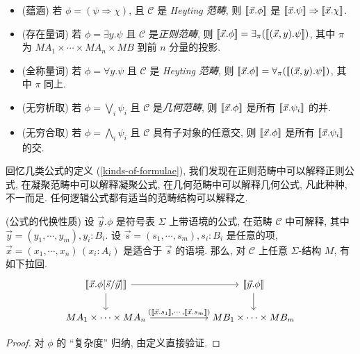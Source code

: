 \begin{definition}
\begin{itemize}
		\item (蕴涵) 若 $\phi = (\psi \Rightarrow \chi)$, 且 $\mathcal C$ 是 \emph{Heyting 范畴}, 则
		${[\![\vec x.\phi]\!]}$ 是 ${[\![\vec x.\psi]\!]} \Rightarrow {[\![\vec x.\chi]\!]}$.
		\item (存在量词) 若 $\phi = \exists y. \psi$ 且 $\mathcal C$ 是\emph{正则范畴}, 则 ${[\![\vec x.\phi]\!]} = \exists_{\pi} ({[\![(\vec x,y).\psi]\!]})$,
		其中 $\pi$ 为 $MA_1\times\cdots\times MA_n \times MB$ 到前 $n$ 分量的投影.
		\item (全称量词) 若 $\phi = \forall y. \psi$ 且 $\mathcal C$ 是 \emph{Heyting 范畴}, 则 ${[\![\vec x.\phi]\!]} = \forall_{\pi} ({[\![(\vec x,y).\psi]\!]})$, 其中 $\pi$ 同上.
		\item (无穷析取) 若 $\phi = \bigvee_i \psi_i$ 且 $\mathcal C$ 是\emph{几何范畴}, 则 ${[\![\vec x.\phi]\!]}$ 是所有 ${[\![\vec x.\psi_i]\!]}$ 的并.
		\item (无穷合取) 若 $\phi = \bigwedge_i \psi_i$ 且 $\mathcal C$ 具有子对象的任意交, 则 ${[\![\vec x.\phi]\!]}$ 是所有 ${[\![\vec x.\psi_i]\!]}$ 的交.
	\end{itemize}
\end{definition}

回忆几类公式的定义 (\ref{kinds-of-formulae}), 我们发现在正则范畴中可以解释正则公式, 在凝聚范畴中可以解释凝聚公式, 在几何范畴中可以解释几何公式, 凡此种种, 不一而足. 任何逻辑公式都有适当的范畴结构可以解释之.

\begin{prop}
	{(公式的代换性质)}
	设 $\vec y.\phi$ 是符号表 $\Sigma$ 上带语境的公式, 在范畴 $\mathcal C$ 中可解释,
	其中 $\vec y = (y_1,\cdots,y_m), y_i\colon B_i$.
	设 $\vec s = (s_1,\cdots,s_m), s_i\colon B_i$ 是任意的项, $\vec x=(x_1,\cdots,x_n)\,(x_i\colon A_i)$ 是适合于 $\vec s$ 的语境.
	那么, 对 $\mathcal C$ 上任意 $\Sigma$-结构 $M$,
	有如下拉回.
	\[\begin{tikzcd}[ampersand replacement=\&,column sep=6em]
		{\interpretation{\vec x.\phi[\vec s / \vec y]}} \& {\interpretation{\vec y.\phi}} \\
		{MA_1\times\cdots\times MA_n} \& {MB_1\times\cdots\times MB_m}
		\arrow[from=1-1, to=2-1]
		\arrow["{(\interpretation{\vec x.s_1},\cdots,\interpretation{\vec x.s_m})}", from=2-1, to=2-2]
		\arrow[from=1-1, to=1-2]
		\arrow[from=1-2, to=2-2]
	\end{tikzcd}\]
\end{prop}
\begin{proof}
	对 $\phi$ 的 ``复杂度'' 归纳, 由定义直接验证.
\end{proof}

